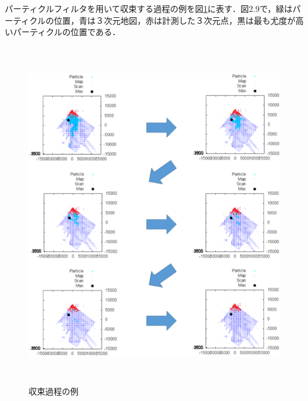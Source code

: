 \newpage
パーティクルフィルタを用いて収束する過程の例を図{\ref{収束過程の例}}に表す．図2.9で，緑はパーティクルの位置，青は３次元地図，赤は計測した３次元点，黒は最も尤度が高いパーティクルの位置である．
\vspace{10mm}
\begin{figure}[htbp]
  \begin{center}
   \includegraphics[height=150mm]{figure/収束過程の例.eps}
   \caption{収束過程の例}
   \label{収束過程の例}
  \end{center}
\end{figure}
%
\newpage
%
